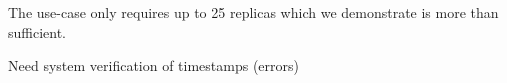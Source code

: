 

The use-case only requires up to 25 replicas which we demonstrate is more than sufficient. 




Need system verification of timestamps (errors) 




